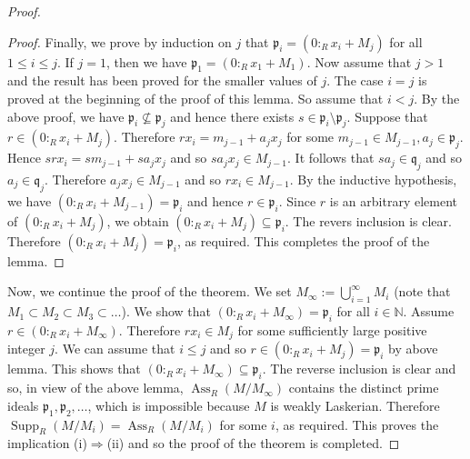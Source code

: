 \documentclass[10pt,a4paper]{amsart}
\newcommand\N{\mathbb N}
\newcommand\ass {\operatorname{Ass}}
\newcommand\fp{\mathfrak p}
\newcommand\fq{\mathfrak q}
\newcommand\supp {\operatorname{Supp}}
\begin{document}
\begin{proof}
\begin{proof}
 Finally, we prove by induction on $j$  that $\fp_i=(0:_Rx_i+M_j)$ for all $1\leq i\leq j$. If $j=1$, then we have $\fp_1=(0:_Rx_1+M_1)$. Now assume that $j>1$ and the result has been proved for the smaller values of $j$.  The case $i=j$ is proved at the beginning of the proof of this lemma. So assume  that $i<j$. By the above proof, we have $\fp_i\nsubseteq \fp_j$ and hence there exists $s\in \fp_i\setminus\fp_j$. Suppose that $r\in(0:_Rx_i+M_j)$. Therefore $rx_i=m_{j-1}+a_jx_j$ for some $m_{j-1}\in M_{j-1}, a_j\in\fp_j$. Hence
$srx_i=sm_{j-1}+sa_jx_j$ and so $sa_jx_j\in M_{j-1}$. It follows that $sa_j\in\fq_j$ and so $a_j\in\fq_j$. Therefore $a_jx_j\in M_{j-1}$ and so  $rx_i\in M_{j-1}$. By the inductive hypothesis, we have $(0:_Rx_i+M_{j-1})=\fp_i$ and hence $r\in\fp_i$. Since $r$ is an arbitrary element of $(0:_Rx_i+M_j)$, we obtain $(0:_Rx_i+M_j)\subseteq\fp_i$. The revers inclusion is clear. Therefore  $(0:_Rx_i+M_j)=\fp_i$, as required. This completes the proof of the lemma.
   \end{proof}
 Now, we continue the proof of the theorem.  We set $M_\infty:=\bigcup_{i=1}^\infty M_i$ (note that $M_1\subset M_2\subset M_3\subset \dots$). We show that $(0:_Rx_i+M_\infty)=\fp_i$ for all $i\in\N$. Assume $r\in (0:_Rx_i+M_\infty)$. Therefore $rx_i\in M_j$ for some sufficiently large positive integer $j$. We can assume that $i\leq j$ and so $r\in (0:_Rx_i+M_j)=\fp_i$ by above lemma.  This shows that $(0:_Rx_i+M_\infty)\subseteq\fp_i$. The reverse inclusion is clear and so, in view of the above lemma, $\ass_R(M/M_\infty)$ contains the distinct prime ideals $\fp_1, \fp_2, \dots$, which is impossible because $M$ is weakly Laskerian. Therefore $\supp_R(M/M_i)=\ass_R(M/M_i)$ for some $i$, as required. This proves  the implication (i)$\Rightarrow$(ii) and so the proof of the theorem is completed.
\end{proof}
\end{document}
